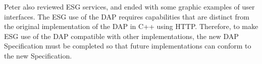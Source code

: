 Peter also reviewed \ac{ESG} services, and ended with some graphic
examples of user interfaces.  The \ac{ESG} use of the \ac{DAP}
requires capabilities that are distinct from the original
implementation of the \ac{DAP} in C++ using HTTP.  Therefore, to make
\ac{ESG} use of the \ac{DAP} compatible with other implementations,
the new \ac{DAP} Specification must be completed so that future
implementations can conform to the new Specification.

%
%
%
%


